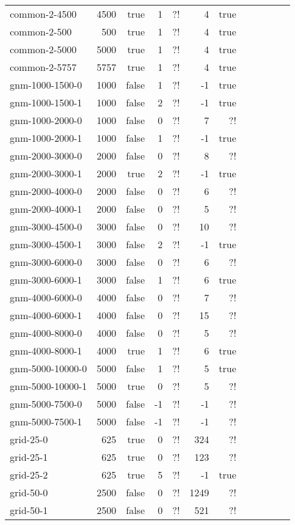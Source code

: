 \documentclass[a4paper]{article}
\begin{document}
\begin{longtable}{lrrrrrrrrrrr}
	common-2-4500 & 4500 & true & 1 & ?! & 4 & true\\
	common-2-500 & 500 & true & 1 & ?! & 4 & true\\
	common-2-5000 & 5000 & true & 1 & ?! & 4 & true\\
	common-2-5757 & 5757 & true & 1 & ?! & 4 & true\\
	gnm-1000-1500-0 & 1000 & false & 1 & ?! & -1 & true\\
	gnm-1000-1500-1 & 1000 & false & 2 & ?! & -1 & true\\
	gnm-1000-2000-0 & 1000 & false & 0 & ?! & 7 & ?!\\
	gnm-1000-2000-1 & 1000 & false & 1 & ?! & -1 & true\\
	gnm-2000-3000-0 & 2000 & false & 0 & ?! & 8 & ?!\\
	gnm-2000-3000-1 & 2000 & true & 2 & ?! & -1 & true\\
	gnm-2000-4000-0 & 2000 & false & 0 & ?! & 6 & ?!\\
	gnm-2000-4000-1 & 2000 & false & 0 & ?! & 5 & ?!\\
	gnm-3000-4500-0 & 3000 & false & 0 & ?! & 10 & ?!\\
	gnm-3000-4500-1 & 3000 & false & 2 & ?! & -1 & true\\
	gnm-3000-6000-0 & 3000 & false & 0 & ?! & 6 & ?!\\
	gnm-3000-6000-1 & 3000 & false & 1 & ?! & 6 & true\\
	gnm-4000-6000-0 & 4000 & false & 0 & ?! & 7 & ?!\\
	gnm-4000-6000-1 & 4000 & false & 0 & ?! & 15 & ?!\\
	gnm-4000-8000-0 & 4000 & false & 0 & ?! & 5 & ?!\\
	gnm-4000-8000-1 & 4000 & true & 1 & ?! & 6 & true\\
	gnm-5000-10000-0 & 5000 & false & 1 & ?! & 5 & true\\
	gnm-5000-10000-1 & 5000 & true & 0 & ?! & 5 & ?!\\
	gnm-5000-7500-0 & 5000 & false & -1 & ?! & -1 & ?!\\
	gnm-5000-7500-1 & 5000 & false & -1 & ?! & -1 & ?!\\
	grid-25-0 & 625 & true & 0 & ?! & 324 & ?!\\
	grid-25-1 & 625 & true & 0 & ?! & 123 & ?!\\
	grid-25-2 & 625 & true & 5 & ?! & -1 & true\\
	grid-50-0 & 2500 & false & 0 & ?! & 1249 & ?!\\
	grid-50-1 & 2500 & false & 0 & ?! & 521 & ?!\\

\end{longtable}
\end{document}
